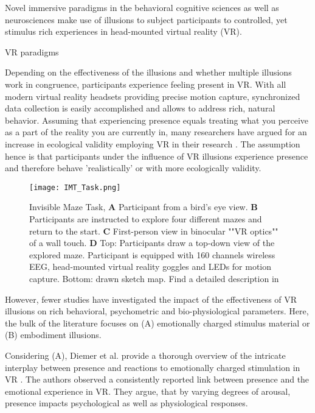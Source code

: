Novel immersive paradigms in the behavioral cognitive sciences as well as neurosciences make use of illusions to subject participants to controlled, yet stimulus rich experiences in head-mounted virtual reality (VR). 

VR paradigms 

Depending on the effectiveness of the illusions and whether multiple illusions work in congruence, participants experience feeling present in VR. With all modern virtual reality headsets providing precise motion capture, synchronized data collection is easily accomplished and allows to address rich, natural behavior. Assuming that experiencing presence equals treating what you perceive as a part of the reality you are currently in, many researchers have argued for an increase in ecological validity employing VR in their research \cite{Bohil2011, Parsons2015, Parsons2017}. The assumption hence is that participants under the influence of VR illusions experience presence and therefore behave 'realistically' or with more ecologically validity.

\begin{figure}[t]
\centering
\texttt{[image: IMT\_Task.png]}
\vspace{0pt}
\caption{Invisible Maze Task, \textbf{A} Participant from a bird’s eye view. \textbf{B} Participants are instructed to explore four different mazes and return to the start. \textbf{C} First-person view in binocular ""VR optics"" of a wall touch. \textbf{D} Top: Participants draw a top-down view of the explored maze. Participant is equipped with 160 channels wireless EEG, head-mounted virtual reality goggles and LEDs for motion capture. Bottom: drawn sketch map. Find a detailed description in~\cite{Gehrke2018}}
\label{imt_task}
\end{figure}

However, fewer studies have investigated the impact of the effectiveness of VR illusions on rich behavioral, psychometric and bio-physiological parameters. Here, the bulk of the literature focuses on (A) emotionally charged stimulus material or (B) embodiment illusions.

Considering (A), Diemer et al. provide a thorough overview of the intricate interplay between presence and reactions to emotionally charged stimulation in VR \cite{Diemer2015}. The authors observed a consistently reported link between presence and the emotional experience in VR. They argue, that by varying degrees of arousal, presence impacts psychological as well as physiological responses.

